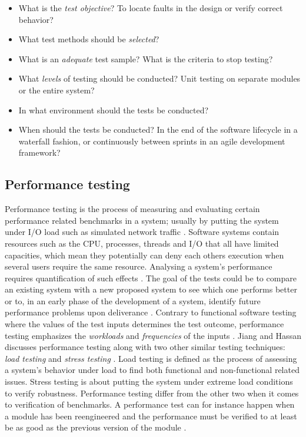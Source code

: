 \begin{itemize}
  \item What is the \textit{test objective}? To locate faults in the design or
    verify correct behavior?
  \item What test methods should be \textit{selected}?
  \item What is an \textit{adequate} test sample? What is the criteria to stop
    testing?
  \item What \textit{levels} of testing should be conducted? Unit testing on
    separate modules or the entire system?
  \item In what environment should the tests be conducted?
  \item When should the tests be conducted? In the end of the software
    lifecycle in a waterfall fashion, or continuously between sprints in an
    agile development framework?
\end{itemize}

\subsection{Performance testing}

Performance testing is the process of measuring and evaluating certain
performance related benchmarks in a system; usually by putting the system under
I/O load such as simulated network traffic \cite{jiang2015survey}. Software
systems contain resources such as the CPU, processes, threads and I/O that all
have limited capacities, which mean they potentially can deny each others
execution when several users require the same resource. Analysing a system's
performance requires quantification of such effects \cite{woodside2007future}.
The goal of the tests could be to compare an existing system with a new
proposed system to see which one performs better \cite{avritzer1996deriving} or
to, in an early phase of the development of a system, identify future
performance problems upon deliverance \cite{weyuker2000experience}. Contrary to
functional software testing where the values of the test inputs determines the
test outcome, performance testing emphasizes the \textit{workloads} and
\textit{frequencies} of the inputs \cite{weyuker2000experience}. Jiang and
Hassan discusses performance testing along with two other similar testing
techniques: \textit{load testing} and \textit{stress testing}
\cite{jiang2015survey}. Load testing is defined as the process of assessing a
system's behavior under load to find both functional and non-functional related
issues. Stress testing is about putting the system under extreme load
conditions to verify robustness.  Performance testing differ from the other two
when it comes to verification of benchmarks. A performance test can for
instance happen when a module has been reengineered and the performance must be
verified to at least be as good as the previous version of the module
\cite{jiang2015survey}.


